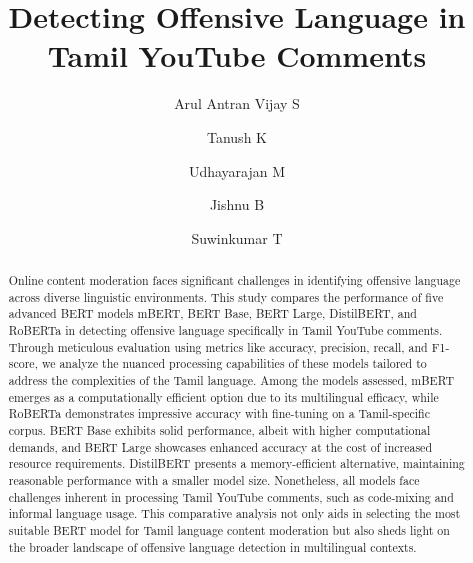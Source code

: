 \documentclass{svproc}
\begin{document}
\mainmatter              %
%
\title{Detecting Offensive Language in Tamil YouTube Comments}
%
\author{Arul Antran Vijay S\and
Tanush K\and
Udhayarajan M\and
Jishnu B\and
Suwinkumar T}
%
%

\maketitle              %
%
\begin{abstract}

Online content moderation faces significant challenges in identifying offensive language across diverse linguistic environments. This study compares the performance of five advanced BERT models mBERT, BERT Base, BERT Large, DistilBERT, and RoBERTa in detecting offensive language specifically in Tamil YouTube comments. Through meticulous evaluation using metrics like accuracy, precision, recall, and F1-score, we analyze the nuanced processing capabilities of these models tailored to address the complexities of the Tamil language. Among the models assessed, mBERT emerges as a computationally efficient option due to its multilingual efficacy, while RoBERTa demonstrates impressive accuracy with fine-tuning on a Tamil-specific corpus. BERT Base exhibits solid performance, albeit with higher computational demands, and BERT Large showcases enhanced accuracy at the cost of increased resource requirements. DistilBERT presents a memory-efficient alternative, maintaining reasonable performance with a smaller model size. Nonetheless, all models face challenges inherent in processing Tamil YouTube comments, such as code-mixing and informal language usage. This comparative analysis not only aids in selecting the most suitable BERT model for Tamil language content moderation but also sheds light on the broader landscape of offensive language detection in multilingual contexts. 

\end{abstract}
\end{document}
